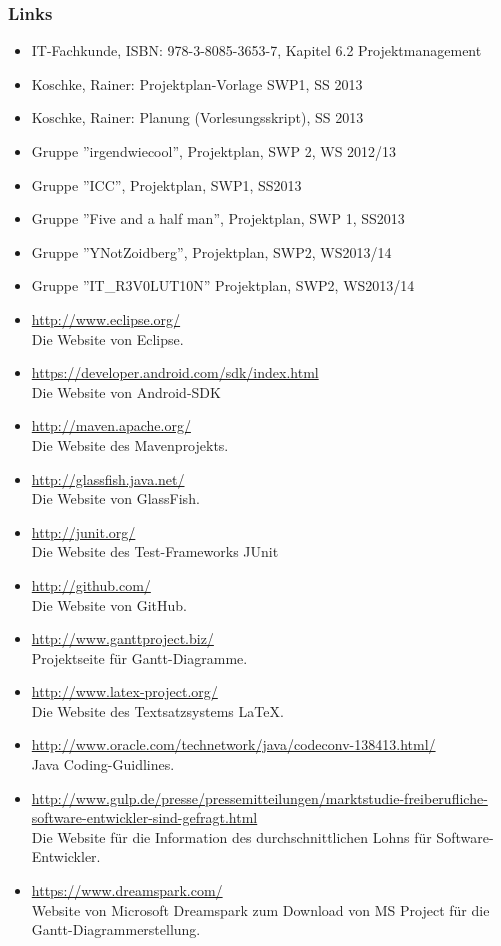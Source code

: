 \documentclass[fontsize=12pt,paper=a4,twoside]{scrartcl}
\begin{document}
\subsubsection{Links}
\begin{itemize}



  \item IT-Fachkunde, ISBN: 978-3-8085-3653-7, Kapitel 6.2 Projektmanagement
  \item Koschke, Rainer: Projektplan-Vorlage SWP1, SS 2013
  \item Koschke, Rainer: Planung (Vorlesungsskript), SS 2013
  \item Gruppe ''irgendwiecool'', Projektplan, SWP 2, WS 2012/13
  \item Gruppe ''ICC'', Projektplan, SWP1, SS2013
  \item Gruppe ''Five and a half man'', Projektplan, SWP 1, SS2013
  \item Gruppe ''YNotZoidberg'', Projektplan, SWP2, WS2013/14
  \item Gruppe ''IT\_R3V0LUT10N'' Projektplan, SWP2, WS2013/14
 


\item{\url{http://www.eclipse.org/}\\ Die Website von Eclipse.} \item{\url{https://developer.android.com/sdk/index.html}\\ Die Website von Android-SDK}
\item{\url{http://maven.apache.org/}\\ Die Website des Mavenprojekts.}
\item{\url{http://glassfish.java.net/}\\ Die Website von GlassFish.}
\item{\url{http://junit.org/}\\ Die Website des Test-Frameworks JUnit}
\item{\url{http://github.com/}\\ Die Website von GitHub.}
\item{\url{http://www.ganttproject.biz/}\\ Projektseite für Gantt-Diagramme.}
\item{\url{http://www.latex-project.org/}\\ Die Website des Textsatzsystems \LaTeX.}
\item{\url{http://www.oracle.com/technetwork/java/codeconv-138413.html/}\\ Java Coding-Guidlines.}
\item{\url{http://www.gulp.de/presse/pressemitteilungen/marktstudie-freiberufliche-software-entwickler-sind-gefragt.html}\\ Die Website für die Information des durchschnittlichen Lohns für Software-Entwickler.}
\item{\url{https://www.dreamspark.com/}\\Website von Microsoft Dreamspark zum Download von MS Project für die Gantt-Diagrammerstellung.}
\end{itemize}
\end{document}
